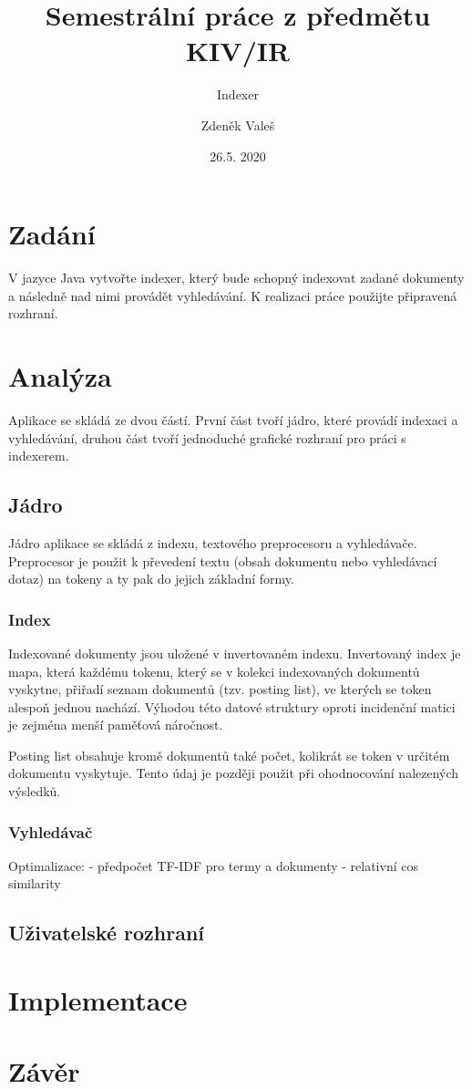 \documentclass[11pt,a4paper]{scrartcl}
\begin{document}
	\title{Semestrální práce z předmětu KIV/IR}
	\subtitle{Indexer}
	\author{Zdeněk Valeš}
	\date{26.5. 2020}
	\maketitle
	\newpage
	
	\section{Zadání}
	V jazyce Java vytvořte indexer, který bude schopný indexovat zadané dokumenty a následně nad nimi provádět vyhledávání. K realizaci práce použijte připravená rozhraní.
	
	\section{Analýza}
	Aplikace se skládá ze dvou částí. První část tvoří jádro, které provádí indexaci a vyhledávání, druhou část tvoří jednoduché grafické rozhraní pro práci s indexerem.
	
	\subsection{Jádro}
	Jádro aplikace se skládá z indexu, textového preprocesoru  a vyhledávače. Preprocesor je použit k převedení textu (obsah dokumentu nebo vyhledávací dotaz) na tokeny a ty pak do jejich základní formy.
	
	\subsubsection{Index}
	Indexované dokumenty jsou uložené v invertovaném indexu. Invertovaný index je mapa, která každému tokenu, který se v kolekci indexovaných dokumentů vyskytne, přiřadí seznam dokumentů (tzv. posting list), ve kterých se token alespoň jednou nachází. Výhodou této datové struktury oproti incidenční matici je zejména menší paměťová náročnost.
	
	Posting list obsahuje kromě dokumentů také počet, kolikrát se token v určitém dokumentu vyskytuje. Tento údaj je později použit při ohodnocování nalezených výsledků.
	
	
	
	\subsubsection{Vyhledávač}
	Optimalizace:
		 - předpočet TF-IDF pro termy a dokumenty
		 - relativní cos similarity
	
	
	
	
	
	\subsection{Uživatelské rozhraní}
	
	\section{Implementace}
	
	
	\section{Závěr}
	
\end{document}
